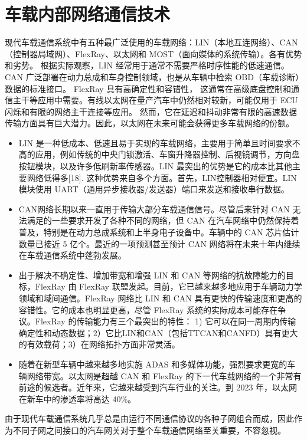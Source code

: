 \section{车载内部网络通信技术}
现代车载通信系统中有五种最广泛使用的车载网络：LIN（本地互连网络）、CAN（控制器局域网）、FlexRay、以太网和 MOST（面向媒体的系统传输）。各有优势和劣势。
根据实际观察，LIN 经常用于通常不需要严格时序性能的低速通信。CAN 广泛部署在动力总成和车身控制领域，也是从车辆中检索 OBD（车载诊断）数据的标准接口。
FlexRay 具有高确定性和容错性，
这通常在高级底盘控制和通信主干等应用中需要。有线以太网在量产汽车中仍然相对较新，可能仅用于 ECU 闪烁和有限的网络主干连接等应用。
然而，它在延迟和抖动非常有限的高速数据传输方面具有巨大潜力。因此，以太网在未来可能会获得更多车载网络的份额。

\begin{itemize}
    \item LIN 是一种低成本、低速且易于实现的车载网络，主要用于简单且时间要求不高的应用，例如传统的中央门锁激活、车窗升降器控制、后视镜调节，方向盘按钮模块，以及许多低刷新率传感器。LIN 最突出的优势是它的成本比其他主要网络低得多[18]. 这种优势来自多个方面。首先，LIN控制器相对便宜。LIN 模块使用 UART（通用异步接收器/发送器）端口来发送和接收串行数据。
    \item CAN网络长期以来一直用于传输大部分车载通信信号。尽管后来针对 CAN 无法满足的一些要求开发了各种不同的网络，但 CAN 在汽车网络中仍然保持着普及，特别是在动力总成系统和上半身电子设备中。车辆中的 CAN 芯片估计数量已接近 5 亿个。最近的一项预测甚至预计 CAN 网络将在未来十年内继续在车载通信系统中蓬勃发展。
    \item 出于解决不确定性、增加带宽和增强 LIN 和 CAN 等网络的抗故障能力的目标，FlexRay 由 FlexRay 联盟发起。目前，它已越来越多地应用于车辆动力学领域和域间通信。FlexRay 网络比 LIN 和 CAN 具有更快的传输速度和更高的容错性。它的成本也明显更高，尽管 FlexRay 系统的实际成本可能存在争议。FlexRay 的传输能力有三个最突出的特性： 1) 它可以在同一周期内传输确定性和动态数据；2）它比LIN和CAN（包括TTCAN和CANFD）具有更大的有效载荷；3）在网络拓扑方面非常灵活。
    \item 随着在新型车辆中越来越多地实施 ADAS 和多媒体功能，强烈要求更宽的车辆网络带宽。以太网是超越 CAN 和 FlexRay 的下一代车载网络的一个非常有前途的候选者。近年来，它越来越受到汽车行业的关注。到 2023 年，以太网在新车中的渗透率将高达 40\%。
\end{itemize}

由于现代车载通信系统几乎总是由运行不同通信协议的各种子网组合而成，因此作为不同子网之间接口的汽车网关对于整个车载通信网络至关重要，不容忽视。

